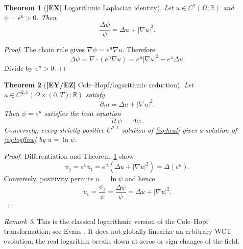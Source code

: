 \documentclass[11pt,letterpaper]{article}
\newtheorem{theorem}{Theorem}[section]
\theoremstyle{definition}
\theoremstyle{remark}
\newtheorem{remark}[theorem]{Remark}
\newcommand{\R}{\mathbb R}
\newcommand{\abs}[1]{\left\lvert#1\right\rvert}
\newcommand{\id}[1]{\textnormal{\textbf{[#1]}}}
\begin{document}
\begin{theorem}[\id{EX} Logarithmic Laplacian identity]\label{thm:loglap}
Let $u\in C^2(\Omega;\R)$ and $\psi=e^u>0$. Then
\begin{equation}\label{eq:loglap}
\boxed{\frac{\Delta\psi}{\psi}=\Delta u+\abs{\nabla u}^2}.
\end{equation}
\end{theorem}
\begin{proof}
The chain rule gives $\nabla\psi=e^u\nabla u$.
Therefore
\begin{equation*}
\Delta\psi=\nabla\cdot(e^u\nabla u)
=e^u\abs{\nabla u}^2+e^u\Delta u.
\end{equation*}
Divide by $e^u>0$.
\end{proof}

\begin{theorem}[\id{EY/EZ} Cole--Hopf/logarithmic reduction]\label{thm:colehopf}
Let $u\in C^{2,1}(\Omega\times(0,T);\R)$ satisfy
\begin{equation}\label{eq:logflow}
\partial_tu=\Delta u+\abs{\nabla u}^2.
\end{equation}
Then $\psi=e^u$ satisfies the heat equation
\begin{equation}\label{eq:heat}
\boxed{\partial_t\psi=\Delta\psi}.
\end{equation}
Conversely, every strictly positive $C^{2,1}$ solution of
\eqref{eq:heat} gives a solution of \eqref{eq:logflow} by $u=\ln\psi$.
\end{theorem}
\begin{proof}
Differentiation and Theorem~\ref{thm:loglap} show
\begin{equation*}
\psi_t=e^uu_t=e^u(\Delta u+\abs{\nabla u}^2)=\Delta(e^u).
\end{equation*}
Conversely, positivity permits $u=\ln\psi$ and hence
\begin{equation*}
u_t=\frac{\psi_t}{\psi}
=\frac{\Delta\psi}{\psi}
=\Delta u+\abs{\nabla u}^2.
\end{equation*}
\end{proof}
\begin{remark}
This is the classical logarithmic version of the Cole--Hopf
transformation; see Evans \cite[\S 4.4]{evans}.
It does not globally linearize an arbitrary WCT evolution; the
real logarithm breaks down at zeros or sign changes of the field.
\end{remark}
\end{document}
